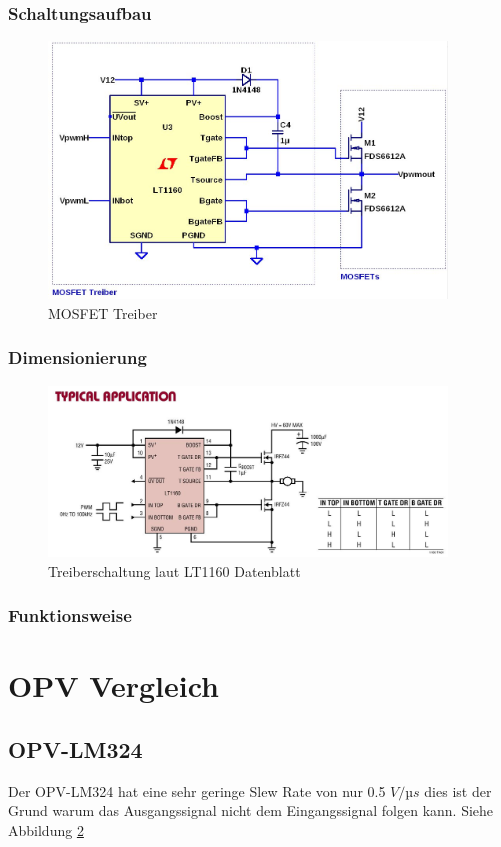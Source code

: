 \documentclass[11pt,a4paper,bibtotoc,oneside]{scrbook}
\begin{document}
\subsection{Schaltungsaufbau}
    \begin{figure}[ht]
    \centering
        \includegraphics[width=300pt]{./picture/treiber.png}
        \caption{\label{lm324}{MOSFET Treiber}}
    \end{figure}
\newpage
\subsection{Dimensionierung}
    \begin{figure}[ht]
    \centering
        \includegraphics[width=300pt]{./picture/treiber_orig.png}
        \caption{\label{lm324}{Treiberschaltung laut LT1160 Datenblatt}}
    \end{figure}
\subsection{Funktionsweise}

\chapter{OPV Vergleich}
\section{OPV-LM324}
Der OPV-LM324 hat eine sehr geringe Slew Rate von nur 0.5 $V/µs$ dies ist der Grund warum das Ausgangssignal nicht dem
Eingangssignal folgen kann. Siehe Abbildung \textcolor{blue}{\ref{lm324}}
\end{document}
